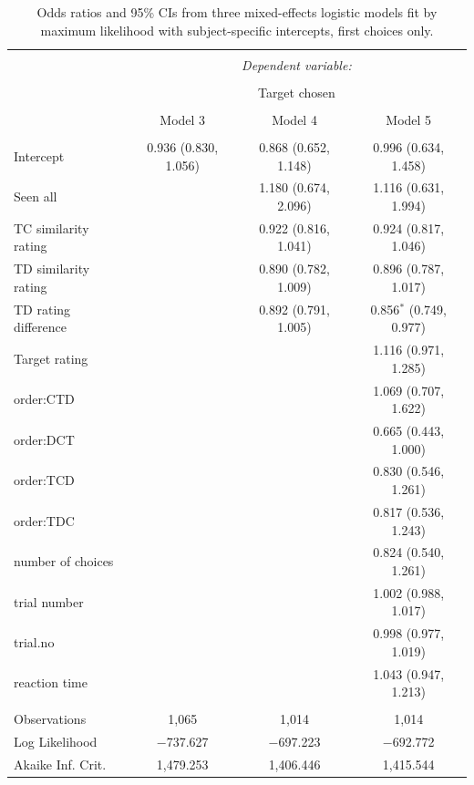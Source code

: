 \documentclass[12pt, a4paper]{article}
\begin{document}
\begin{table}[htb!]
\centering
  \begin{threeparttable}
    \caption{Odds ratios and 95\% CIs from three mixed-effects logistic models fit by maximum likelihood with subject-specific intercepts, first choices only.}
  \label{firstchoice}
\begin{tabular}{@{\extracolsep{5pt}}lccc} 
\\[-1.8ex]\hline 
\hline \\[-1.8ex] 
 & \multicolumn{3}{c}{\textit{Dependent variable:}} \\ 
\cline{2-4} 
\\[-1.8ex] & \multicolumn{3}{c}{Target chosen} \\ 
\\[-1.8ex] & Model 3 & Model 4 & Model 5\\ 
\hline \\[-1.8ex] 
Intercept & 0.936 (0.830, 1.056) & 0.868 (0.652, 1.148) & 0.996 (0.634, 1.458) \\ 
Seen all &  & 1.180 (0.674, 2.096) & 1.116 (0.631, 1.994) \\ 
  TC similarity rating &  & 0.922 (0.816, 1.041) & 0.924 (0.817, 1.046) \\ 
  TD similarity rating &  & 0.890 (0.782, 1.009) & 0.896 (0.787, 1.017) \\ 
  TD rating difference &  & 0.892 (0.791, 1.005) & 0.856$^{*}$ (0.749, 0.977) \\ 
  Target rating &  &  & 1.116 (0.971, 1.285) \\ 
  order:CTD &  &  & 1.069 (0.707, 1.622) \\ 
  order:DCT &  &  & 0.665 (0.443, 1.000) \\ 
  order:TCD &  &  & 0.830 (0.546, 1.261) \\ 
  order:TDC &  &  & 0.817 (0.536, 1.243) \\ 
  number of choices &  &  & 0.824 (0.540, 1.261) \\ 
  trial number &  &  & 1.002 (0.988, 1.017) \\ 
  trial.no &  &  & 0.998 (0.977, 1.019) \\ 
  reaction time &  &  & 1.043 (0.947, 1.213) \\ 
 \hline \\[-1.8ex] 
Observations & 1,065 & 1,014 & 1,014 \\ 
Log Likelihood & $-$737.627 & $-$697.223 & $-$692.772 \\ 
Akaike Inf. Crit. & 1,479.253 & 1,406.446 & 1,415.544 \\ 

\end{tabular}
\end{threeparttable}
\end{table}
\end{document}
